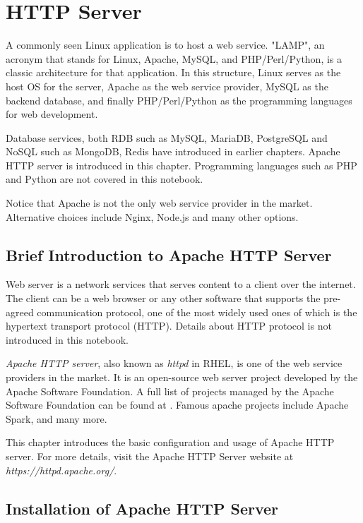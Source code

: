 \chapter{HTTP Server}

A commonly seen Linux application is to host a web service. "LAMP", an acronym that stands for Linux, Apache, MySQL, and PHP/Perl/Python, is a classic architecture for that application. In this structure, Linux serves as the host OS for the server, Apache as the web service provider, MySQL as the backend database, and finally PHP/Perl/Python as the programming languages for web development.

Database services, both RDB such as MySQL, MariaDB, PostgreSQL and NoSQL such as MongoDB, Redis have introduced in earlier chapters. Apache HTTP server is introduced in this chapter. Programming languages such as PHP and Python are not covered in this notebook.

Notice that Apache is not the only web service provider in the market. Alternative choices include Nginx, Node.js and many other options.

\section{Brief Introduction to Apache HTTP Server}

Web server is a network services that serves content to a client over the internet. The client can be a web browser or any other software that supports the pre-agreed communication protocol, one of the most widely used ones of which is the hypertext transport protocol (HTTP). Details about HTTP protocol is not introduced in this notebook.

\textit{Apache HTTP server}, also known as \textit{httpd} in RHEL, is one of the web service providers in the market. It is an open-source web server project developed by the Apache Software Foundation. A full list of projects managed by the Apache Software Foundation can be found at \cite{apache2024projects}. Famous apache projects include Apache Spark, and many more.

This chapter introduces the basic configuration and usage of Apache HTTP server. For more details, visit the Apache HTTP Server website at \textit{https://httpd.apache.org/}. 

\section{Installation of Apache HTTP Server}

